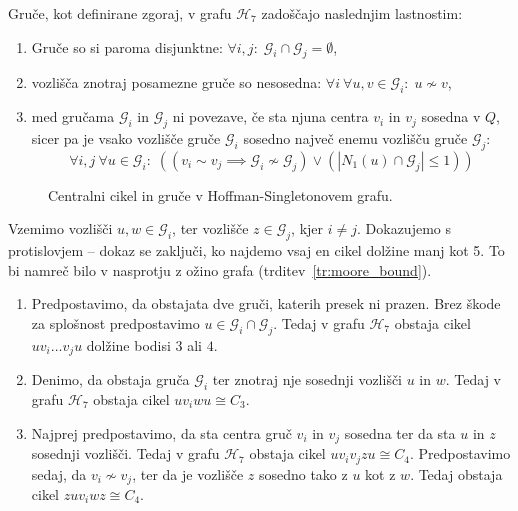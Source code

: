 \documentclass[fin1, tisk]{fmfdelo}
\newcommand{\gr}{\mathscr{G}}
\newcommand{\hof}{\mathscr{H}_{7}}
\begin{document}
\begin{trditev}\label{tr:lastnosti_gruc}
Gruče, kot definirane zgoraj, v grafu $\hof$ zadoščajo naslednjim last\-no\-stim:
\begin{enumerate}[label=(\roman*)]
\item Gruče so si paroma disjunktne: \(\forall i, j: \;\gr_i \cap \gr_j = \emptyset\),
    \label{itm:g1}
\item vozlišča znotraj posamezne gruče so nesosedna:
\(\forall i \ \forall u, v \in \gr_i: \; u \not\sim v\),
    \label{itm:g2}
\item med gručama $\gr_i$ in $\gr_j$ ni povezave, če sta njuna centra \(v_i\) in \(v_j\) sosedna v \(Q\),
sicer pa je vsako vozlišče gruče \(\gr_i\) sosedno največ enemu vozlišču 
gruče \(\gr_j\): \[\forall i, j \ \forall u\in \gr_i:\; \left( (v_i \sim v_j 
\implies \gr_i \not\sim \gr_j) \lor  (|N_1(u) \cap \gr_j| \leq 1)\right)\]
    \label{itm:g3}
\end{enumerate}
\end{trditev}

\begin{figure}[ht]
    \centering
    \def\svgwidth{\columnwidth}
    \caption{Centralni cikel in gruče v Hoffman-Singletonovem grafu.}
    \label{fig:hoffman_1}
\end{figure}

\begin{dokaz}
Vzemimo vozlišči $u, w \in \gr_i$, ter vozlišče $z \in \gr_j$, kjer $i \neq j$.
Dokazujemo s protislovjem -- dokaz se zaključi, ko najdemo 
vsaj en cikel dolžine manj kot 5. To bi namreč bilo v nasprotju z ožino grafa (trditev~\ref{tr:moore_bound}).
\begin{enumerate}[label=(\roman*)]
\item Predpostavimo, da obstajata dve gruči, katerih presek ni prazen.
Brez škode za splošnost predpostavimo $u \in \gr_i \cap \gr_j$.
Tedaj v grafu $\hof$ obstaja cikel $u v_i \ldots v_j u$ dolžine bodisi $3$ ali $4$.
\item Denimo, da obstaja gruča $\gr_i$ ter znotraj nje sosednji vozlišči $u$ in $w$.
Tedaj v grafu $\hof$ obstaja cikel $u v_i w u \cong C_3$.
\item Najprej predpostavimo, da sta centra gruč $v_i$ in $v_j$ sosedna ter da sta $u$ in $z$
sosednji vozlišči. Tedaj v grafu $\hof$ obstaja cikel $u v_i v_j z u \cong C_4$.
Predpostavimo sedaj, da $v_i \not \sim v_j$, ter da je vozlišče $z$ sosedno 
tako z $u$ kot z $w$. Tedaj obstaja cikel $z u v_i w z \cong C_4$. \qedhere
\end{enumerate}
\end{dokaz}
\end{document}
